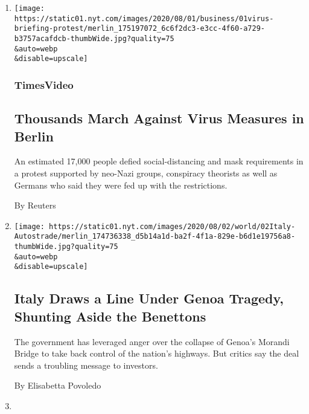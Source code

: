 \begin{enumerate}
\def\labelenumi{\arabic{enumi}.}
\item
  \href{/video/world/europe/100000007268465/coronavirus-protest-germany.html}{}

  \texttt{[image: https://static01.nyt.com/images/2020/08/01/business/01virus-briefing-protest/merlin\_175197072\_6c6f2dc3-e3cc-4f60-a729-b3757acafdcb-thumbWide.jpg?quality=75\\\&auto=webp\\\&disable=upscale]}

  \hypertarget{timesvideo}{%
  \subsubsection{TimesVideo}\label{timesvideo}}

  \hypertarget{thousands-march-against-virus-measures-in-berlin}{%
  \subsection{Thousands March Against Virus Measures in
  Berlin}\label{thousands-march-against-virus-measures-in-berlin}}

  An estimated 17,000 people defied social-distancing and mask
  requirements in a protest supported by neo-Nazi groups, conspiracy
  theorists as well as Germans who said they were fed up with the
  restrictions.

  By Reuters
\item
  \href{/2020/08/01/world/europe/italy-genoa-bridge-collapse-benettons.html}{}

  \texttt{[image: https://static01.nyt.com/images/2020/08/02/world/02Italy-Autostrade/merlin\_174736338\_d5b14a1d-ba2f-4f1a-829e-b6d1e19756a8-thumbWide.jpg?quality=75\\\&auto=webp\\\&disable=upscale]}

  \hypertarget{italy-draws-a-line-under-genoa-tragedy-shunting-aside-the-benettons}{%
  \subsection{Italy Draws a Line Under Genoa Tragedy, Shunting Aside the
  Benettons}\label{italy-draws-a-line-under-genoa-tragedy-shunting-aside-the-benettons}}

  The government has leveraged anger over the collapse of Genoa's
  Morandi Bridge to take back control of the nation's highways. But
  critics say the deal sends a troubling message to investors.

  By Elisabetta Povoledo
\item
  \href{/2020/08/01/world/europe/germany-nazi-infiltration.html}{}


\end{enumerate}
